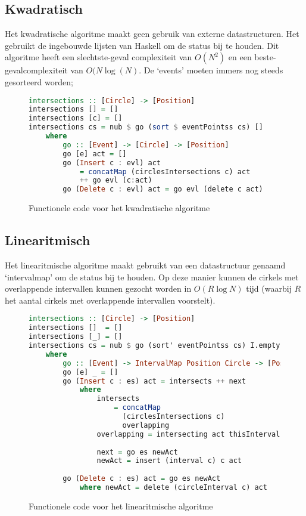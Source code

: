 \subsection{Kwadratisch}
Het kwadratische algoritme maakt geen gebruik van externe datastructuren. Het gebruikt de ingebouwde lijsten van Haskell om de status bij te houden. Dit algoritme heeft een slechtste-geval complexiteit van $O(N^2)$ en een beste-gevalcomplexiteit van $O(N\log(N)$. De `events' moeten immers nog steeds gesorteerd worden;

\begin{figure}[H]
\begin{lstlisting}[language=haskell]
intersections :: [Circle] -> [Position]
intersections [] = []
intersections [c] = []
intersections cs = nub $ go (sort $ eventPointss cs) []
    where
        go :: [Event] -> [Circle] -> [Position]
        go [e] act = []
        go (Insert c : evl) act 
        	= concatMap (circlesIntersections c) act 
        	++ go evl (c:act)
        go (Delete c : evl) act = go evl (delete c act)
\end{lstlisting}
\label{imp:quadratic}
\caption{Functionele code voor het kwadratische algoritme}
\end{figure}

\newpage
\subsection{Linearitmisch}
Het linearitmische algoritme maakt gebruikt van een datastructuur genaamd `intervalmap' om de status bij te houden.
Op deze manier kunnen de cirkels met overlappende intervallen kunnen gezocht worden in $O(R\log N)$ tijd (waarbij $R$ het aantal cirkels met overlappende intervallen voorstelt).

\begin{figure}[H]
\begin{lstlisting}[language=haskell]
intersections :: [Circle] -> [Position]
intersections []  = []
intersections [_] = []
intersections cs = nub $ go (sort' eventPointss cs) I.empty
    where
        go :: [Event] -> IntervalMap Position Circle -> [Position]
        go [e] _ = []
        go (Insert c : es) act = intersects ++ next
            where
                intersects 
                	= concatMap 
                	  (circlesIntersections c) 
                	  overlapping
                overlapping = intersecting act thisInterval
                
                next = go es newAct
                newAct = insert (interval c) c act
              
        go (Delete c : es) act = go es newAct
            where newAct = delete (circleInterval c) act
\end{lstlisting}
\label{imp:linearithmic}
\caption{Functionele code voor het linearitmische algoritme}
\end{figure}